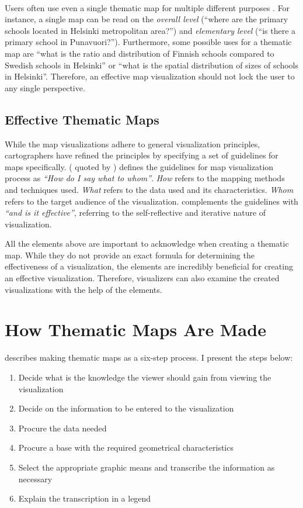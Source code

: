 ~

Users often use even a single thematic map for multiple different purposes \citep[chap.~2]{schlichtmann_visualization_2002}. For instance, a single map can be read on the \emph{overall level} (``where are the primary schools located in Helsinki metropolitan area?'') and \emph{elementary level} (``is there a primary school in Punavuori?''). Furthermore, some possible uses for a thematic map are ``what is the ratio and distribution of Finnish schools compared to Swedish schools in Helsinki'' or ``what is the spatial distribution of sizes of schools in Helsinki''. Therefore, an effective map visualization should not lock the user to any single perspective.

\subsection{Effective Thematic Maps}
\label{subsection:effectivemaps}

While the map visualizations adhere to general visualization principles, cartographers have refined the principles by specifying a set of guidelines for maps specifically. \citeauthor{koeman_het_1969} (\citeyear{koeman_het_1969} quoted by \citealt[p.~12]{kraak_cartographic_1998}) defines the guidelines for map visualization process as \emph{``How do I say what to whom''}. \emph{How} refers to the mapping methods and techniques used. \emph{What} refers to the data used and its characteristics. \emph{Whom} refers to the target audience of the visualization. \citet{kraak_cartographic_1998} complements the guidelines with \emph{``and is it effective''}, referring to the self-reflective and iterative nature of visualization.

All the elements above are important to acknowledge when creating a thematic map. While they do not provide an exact formula for determining the effectiveness of a visualization, the elements are incredibly beneficial for creating an effective visualization. Therefore, visualizers can also examine the created visualizations with the help of the elements.

\section{How Thematic Maps Are Made}
\label{section:thematicmaps}
\citet{schlichtmann_visualization_2002} describes making thematic maps as a six-step process. I present the steps below:
\begin{enumerate}
	\item Decide what is the knowledge the viewer should gain from viewing the visualization
	\item Decide on the information to be entered to the visualization
	\item Procure the data needed
	\item Procure a base with the required geometrical characteristics
	\item Select the appropriate graphic means and transcribe the information as necessary
	\item Explain the transcription in a legend
\end{enumerate}

